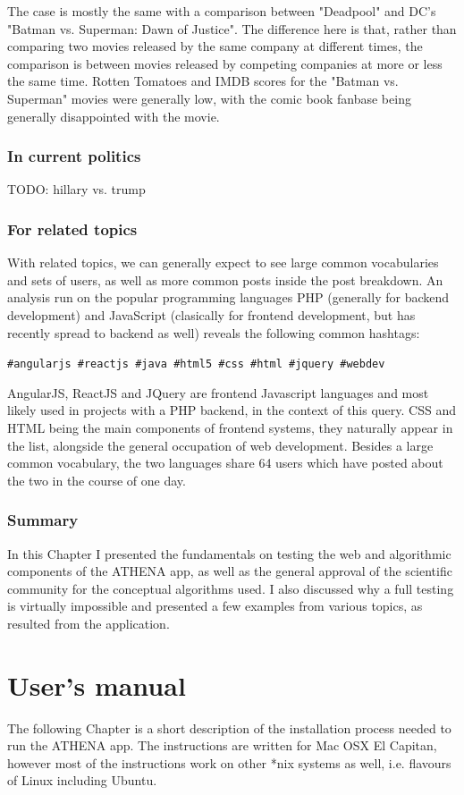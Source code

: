 \documentclass[12pt,a4paper,twoside]{report}
\begin{document}
The case is mostly the same with a comparison between "Deadpool" and DC's "Batman vs. Superman: Dawn of Justice". The difference here is that, rather than comparing two movies released by the same company at different times, the comparison is between movies released by competing companies at more or less the same time. Rotten Tomatoes and IMDB scores for the "Batman vs. Superman" movies were generally low, with the comic book fanbase being generally disappointed with the movie. 

\subsection{In current politics}
 {\color{red} TODO: hillary vs. trump}
 
\subsection{For related topics}
With related topics, we can generally expect to see large common vocabularies and sets of users, as well as more common posts inside the post breakdown.  An analysis run on the popular programming languages PHP (generally for backend development) and JavaScript (clasically for frontend development, but has recently spread to backend as well) reveals the following common hashtags:

\texttt{\#angularjs \#reactjs \#java \#html5 \#css \#html \#jquery \#webdev}

AngularJS, ReactJS and JQuery are frontend Javascript languages and most likely used in projects with a PHP backend, in the context of this query. CSS and HTML being the main components of frontend systems, they naturally appear in the list, alongside the general occupation of web development. Besides a large common vocabulary, the two languages share 64 users which have posted about the two in the course of one day.

\subsection{Summary}
In this Chapter I presented the fundamentals on testing the web and algorithmic components of the ATHENA app, as well as the general approval of the scientific community for the conceptual algorithms used. I also discussed why a full testing is virtually impossible and presented a few examples from various topics, as resulted from the application.

\chapter{User's manual}
The following Chapter is a short description of the installation process needed to run the ATHENA app. The instructions are written for Mac OSX El Capitan, however most of the instructions work on other *nix systems as well, i.e. flavours of Linux including Ubuntu.
\end{document}
